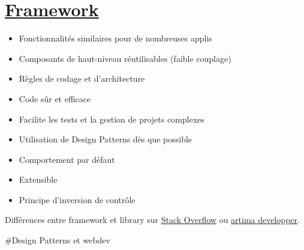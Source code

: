 \hypertarget{framework}{%
\section{\texorpdfstring{\href{http://en.wikipedia.org/wiki/Software_framework}{Framework}}{Framework}}\label{framework}}

\begin{itemize}
\tightlist
\item
  Fonctionnalités similaires pour de nombreuses applis
\item
  Composants de haut-niveau réutilisables (faible couplage)
\item
  Règles de codage et d'architecture
\item
  Code sûr et efficace
\item
  Facilite les tests et la gestion de projets complexes
\item
  Utilisation de Design Patterns dès que possible
\item
  Comportement par défaut
\item
  Extensible
\item
  Principe d'inversion de contrôle
\end{itemize}

Différences entre framework et library sur
\href{http://stackoverflow.com/questions/148747/what-is-the-difference-between-a-framework-and-a-library}{Stack
Overflow} ou
\href{http://www.artima.com/forums/flat.jsp?forum=106\&thread=152104}{artima
developper}.

\#Design Patterns et webdev


